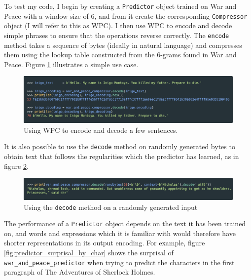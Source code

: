 To test my code, I begin by creating a \texttt{Predictor} object trained on War and Peace with a window size of 6, and from it create the corresponding \texttt{Compressor} object (I will refer to this as WPC). I then use WPC to encode and decode simple phrases to ensure that the operations reverse correctly. The \texttt{encode} method takes a sequence of bytes (ideally in natural language) and compresses them using the lookup table constructed from the 6-grams found in War and Peace. Figure \ref{fig:inigo_encoding_decoding} illustrates a simple use case.

\begin{figure}[h]
\centering
\includegraphics[width=\textwidth]{img/inigo_encoding_decoding.png}
\caption{Using WPC to encode and decode a few sentences.}
\label{fig:inigo_encoding_decoding}
\end{figure}

It is also possible to use the \texttt{decode} method on randomly generated bytes to obtain text that follows the regularities which the predictor has learned, as in figure \ref{fig:predictor_decoding_randomness}.

\begin{figure}[h]
\centering
\includegraphics[width=\textwidth]{img/predictor_decoding_randomness.png}
\caption{Using the \texttt{decode} method on a randomly generated input}
\label{fig:predictor_decoding_randomness}
\end{figure}

The performance of a \texttt{Predictor} object depends on the text it has been trained on, and words and expressions which it is familiar with would therefore have shorter representations in its output encoding. For example, figure \ref{fig:predictor_surprisal_by_char} shows the surprisal of \texttt{war\_and\_peace\_predictor} when trying to predict the characters in the first paragraph of The Adventures of Sherlock Holmes.

